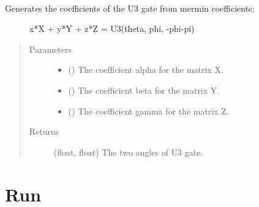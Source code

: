 \documentclass[letterpaper,10pt,english]{sphinxmanual}
\begin{document}
\begin{fulllineitems}
\label{\detokenize{basis_change:mermin_on_qiskit.basis_change.mermin_coeffs_to_U3_coeffs}}~\begin{description}
\item[{Generates the coefficients of the U3 gate from mermin coefficients:}] \leavevmode
x*X + y*Y + z*Z = U3(theta, phi, -phi-pi)

\end{description}
\begin{quote}\begin{description}
\item[{Parameters}] \leavevmode\begin{itemize}
\item {} 
 () \textendash{} The coefficient alpha for the matrix X.

\item {} 
 () \textendash{} The coefficient beta for the matrix Y.

\item {} 
 () \textendash{} The coefficient gamma for the matrix Z.

\end{itemize}

\item[{Returns}] \leavevmode
(float, float) \textendash{} The two angles of U3 gate.

\end{description}\end{quote}

\end{fulllineitems}



\chapter{Run}
\label{\detokenize{run:module-mermin_on_qiskit.run}}\label{\detokenize{run:run}}\label{\detokenize{run::doc}}
\end{document}
